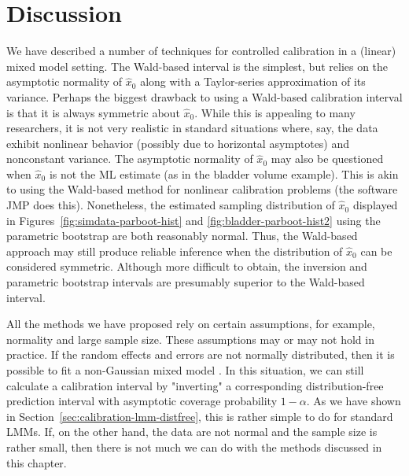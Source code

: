 \documentclass[cmfont,usenames,dvipsnames,leqno]{afit-etd}\usepackage[]{graphicx}\usepackage[]{color}
\newcommand{\wh}[1]{\ensuremath{\widehat{#1}}}
\begin{document}

\section{Discussion}
We have described a number of techniques for controlled calibration in a (linear) mixed model setting. The Wald-based interval is the simplest, but relies on the asymptotic normality of $\wh{x}_0$ along with a Taylor-series approximation of its variance. Perhaps the biggest drawback to using a Wald-based calibration interval is that it is always symmetric about $\wh{x}_0$. While this is appealing to many researchers, it is not very realistic in standard situations where, say, the data exhibit nonlinear behavior (possibly due to horizontal asymptotes) and nonconstant variance. The asymptotic normality of $\wh{x}_0$ may also be questioned when $\wh{x}_0$ is not the \ac{ML} estimate (as in the bladder volume example). This is akin to using the Wald-based method for nonlinear calibration problems (the software JMP does this). Nonetheless, the estimated sampling distribution of $\wh{x}_0$ displayed in Figures~\ref{fig:simdata-parboot-hist} and \ref{fig:bladder-parboot-hist2} using the parametric bootstrap are both reasonably normal. Thus, the Wald-based approach may still produce reliable inference when the distribution of $\wh{x}_0$ can be considered symmetric. Although more difficult to obtain, the inversion and parametric bootstrap  intervals are presumably superior to the Wald-based interval.

All the methods we have proposed rely on certain assumptions, for example, normality and large sample size. These assumptions may or may not hold in practice. If the random effects and errors are not normally distributed, then it is possible to fit a non-Gaussian mixed model \citep[p. 8]{jiang_linear_2007}. In this situation, we can still calculate a calibration interval by "inverting" a corresponding distribution-free prediction interval with asymptotic coverage probability $1-\alpha$. As we have shown in Section~\ref{sec:calibration-lmm-distfree}, this is rather simple to do for standard LMMs. If, on the other hand, the data are not normal and the sample size is rather small, then there is not much we can do with the methods discussed in this chapter. 
\end{document}
